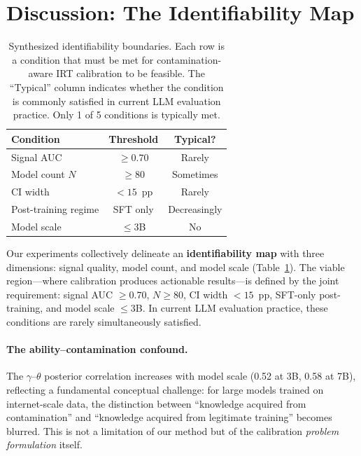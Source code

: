 \documentclass[letterpaper, 10pt, twocolumn]{article}
\begin{document}
\section{Discussion: The Identifiability Map}
\label{sec:discussion}

\begin{table}[t]
\centering
\caption{Synthesized identifiability boundaries. Each row is a condition that must be met for contamination-aware IRT calibration to be feasible. The ``Typical'' column indicates whether the condition is commonly satisfied in current LLM evaluation practice. Only 1 of 5 conditions is typically met.}
\label{tab:identifiability_map}
\small
\begin{tabular}{lcc}
\toprule
Condition & Threshold & Typical? \\
\midrule
Signal AUC & $\geq 0.70$ & Rarely \\
Model count $N$ & $\geq 80$ & Sometimes \\
CI width & $< 15$~pp & Rarely \\
Post-training regime & SFT only & Decreasingly \\
Model scale & $\leq 3$B & No \\
\bottomrule
\end{tabular}
\end{table}

Our experiments collectively delineate an \textbf{identifiability map} with three dimensions: signal quality, model count, and model scale (Table~\ref{tab:identifiability_map}).
The viable region---where calibration produces actionable results---is defined by the joint requirement: signal AUC $\geq 0.70$, $N \geq 80$, CI width $< 15$~pp, SFT-only post-training, and model scale $\leq 3$B.
In current LLM evaluation practice, these conditions are rarely simultaneously satisfied.

\paragraph{The ability--contamination confound.}
The $\gamma$--$\theta$ posterior correlation increases with model scale (0.52 at 3B, 0.58 at 7B), reflecting a fundamental conceptual challenge: for large models trained on internet-scale data, the distinction between ``knowledge acquired from contamination'' and ``knowledge acquired from legitimate training'' becomes blurred.
This is not a limitation of our method but of the calibration \emph{problem formulation} itself.
\end{document}
